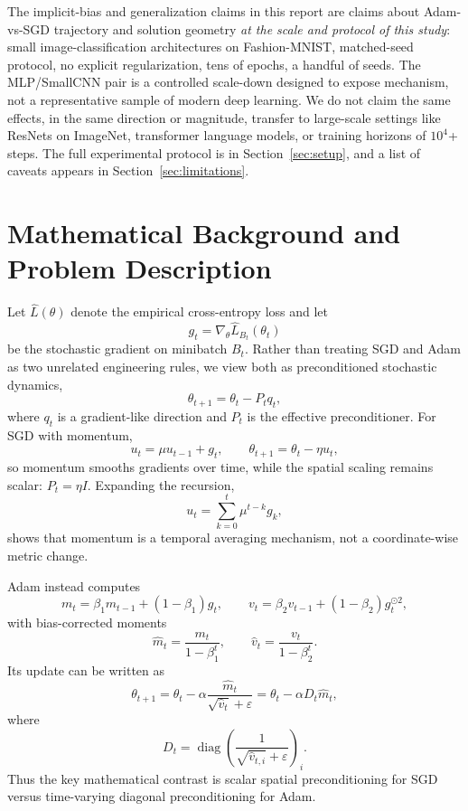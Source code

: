 \documentclass[11pt]{article}
\begin{document}
The implicit-bias and generalization claims in this report are claims about Adam-vs-SGD trajectory and solution geometry \emph{at the scale and protocol of this study}: small image-classification architectures on Fashion-MNIST, matched-seed protocol, no explicit regularization, tens of epochs, a handful of seeds. The MLP/SmallCNN pair is a controlled scale-down designed to expose mechanism, not a representative sample of modern deep learning. We do not claim the same effects, in the same direction or magnitude, transfer to large-scale settings like ResNets on ImageNet, transformer language models, or training horizons of $10^4$+ steps. The full experimental protocol is in Section~\ref{sec:setup}, and a list of caveats appears in Section~\ref{sec:limitations}.

\section{Mathematical Background and Problem Description}

Let $\widehat L(\theta)$ denote the empirical cross-entropy loss and let
\[
  g_t=\nabla_\theta \widehat L_{B_t}(\theta_t)
\]
be the stochastic gradient on minibatch $B_t$. Rather than treating SGD and Adam as two unrelated engineering rules, we view both as preconditioned stochastic dynamics,
\[
  \theta_{t+1}=\theta_t-P_t q_t,
\]
where $q_t$ is a gradient-like direction and $P_t$ is the effective preconditioner. For SGD with momentum,
\[
  u_t=\mu u_{t-1}+g_t,\qquad \theta_{t+1}=\theta_t-\eta u_t,
\]
so momentum smooths gradients over time, while the spatial scaling remains scalar: $P_t=\eta I$. Expanding the recursion,
\[
  u_t=\sum_{k=0}^t \mu^{t-k}g_k,
\]
shows that momentum is a temporal averaging mechanism, not a coordinate-wise metric change.

Adam instead computes
\[
  m_t=\beta_1m_{t-1}+(1-\beta_1)g_t,\qquad
  v_t=\beta_2v_{t-1}+(1-\beta_2)g_t^{\odot 2},
\]
with bias-corrected moments
\[
  \hat m_t=\frac{m_t}{1-\beta_1^t},\qquad
  \hat v_t=\frac{v_t}{1-\beta_2^t}.
\]
Its update can be written as
\[
  \theta_{t+1}=\theta_t-\alpha\frac{\hat m_t}{\sqrt{\hat v_t}+\varepsilon}
  =\theta_t-\alpha D_t\hat m_t,
\]
where
\[
  D_t=\operatorname{diag}\!\left(\frac{1}{\sqrt{\hat v_{t,i}}+\varepsilon}\right)_i.
\]
Thus the key mathematical contrast is scalar spatial preconditioning for SGD versus time-varying diagonal preconditioning for Adam.
\end{document}
